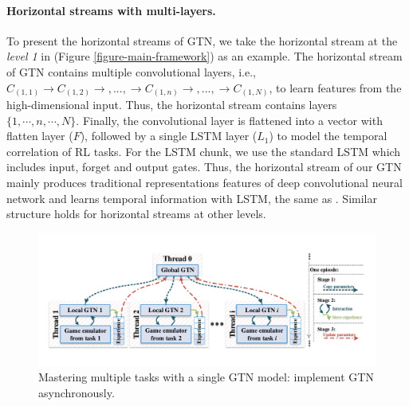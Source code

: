 \documentclass[letterpaper]{article} %
\begin{document}
\paragraph{Horizontal streams with multi-layers.}
To present the horizontal streams of GTN, we take the horizontal stream at the \textit{level 1} in (Figure \ref{figure-main-framework}) as an example.
The horizontal stream of GTN contains multiple convolutional layers, i.e., $C_{(1,1)}\rightarrow C_{(1,2)}\rightarrow,...,\rightarrow C_{(1,n)} \rightarrow,...,\rightarrow C_{(1,N)}$, to learn features from the high-dimensional input. Thus, the horizontal stream contains layers $\{1, \cdots, n, \cdots, N\}$.
Finally, the convolutional layer is flattened into a vector with flatten layer ($F$), followed by a single LSTM layer ($L_1$) to model the temporal correlation of RL tasks.
For the LSTM chunk, we use the standard LSTM \cite{hochreiter1997long} which includes input, forget and output gates.
Thus, the horizontal stream of our GTN mainly produces traditional representations features of deep convolutional neural network \cite{simonyan2014very} and learns temporal information with LSTM, the same as \cite{hausknecht2015deep}. Similar structure holds for horizontal streams at other levels.
\begin{figure}[htb]
	\begin{center}
		\centerline{\includegraphics[width=1\linewidth]{figure/figure-asyn-mtrl-framework}}
		\caption{Mastering multiple tasks with a single GTN model: implement GTN asynchronously.}
		\label{figure-asyn-mtrl-framework}
	\end{center}
\end{figure}
\end{document}
